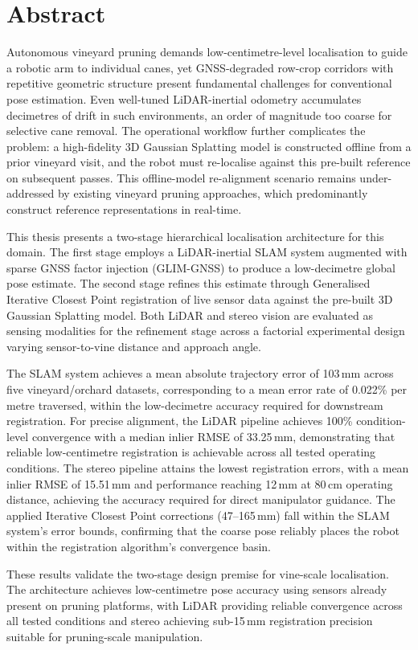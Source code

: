\chapter*{Abstract}

Autonomous vineyard pruning demands low-centimetre-level localisation to guide a robotic arm to individual canes, yet GNSS-degraded row-crop corridors with repetitive geometric structure present fundamental challenges for conventional pose estimation. Even well-tuned LiDAR-inertial odometry accumulates decimetres of drift in such environments, an order of magnitude too coarse for selective cane removal. The operational workflow further complicates the problem: a high-fidelity 3D Gaussian Splatting model is constructed offline from a prior vineyard visit, and the robot must re-localise against this pre-built reference on subsequent passes. This offline-model re-alignment scenario remains under-addressed by existing vineyard pruning approaches, which predominantly construct reference representations in real-time.

This thesis presents a two-stage hierarchical localisation architecture for this domain. The first stage employs a LiDAR-inertial SLAM system augmented with sparse GNSS factor injection (GLIM-GNSS) to produce a low-decimetre global pose estimate. The second stage refines this estimate through Generalised Iterative Closest Point registration of live sensor data against the pre-built 3D Gaussian Splatting model. Both LiDAR and stereo vision are evaluated as sensing modalities for the refinement stage across a factorial experimental design varying sensor-to-vine distance and approach angle.

The SLAM system achieves a mean absolute trajectory error of 103\,mm across five vineyard/orchard datasets, corresponding to a mean error rate of 0.022\% per metre traversed, within the low-decimetre accuracy required for downstream registration. For precise alignment, the LiDAR pipeline achieves 100\% condition-level convergence with a median inlier RMSE of 33.25\,mm, demonstrating that reliable low-centimetre registration is achievable across all tested operating conditions. The stereo pipeline attains the lowest registration errors, with a mean inlier RMSE of 15.51\,mm and performance reaching 12\,mm at 80\,cm operating distance, achieving the accuracy required for direct manipulator guidance. The applied Iterative Closest Point corrections (47--165\,mm) fall within the SLAM system's error bounds, confirming that the coarse pose reliably places the robot within the registration algorithm's convergence basin.

These results validate the two-stage design premise for vine-scale localisation. The architecture achieves low-centimetre pose accuracy using sensors already present on pruning platforms, with LiDAR providing reliable convergence across all tested conditions and stereo achieving sub-15\,mm registration precision suitable for pruning-scale manipulation.

